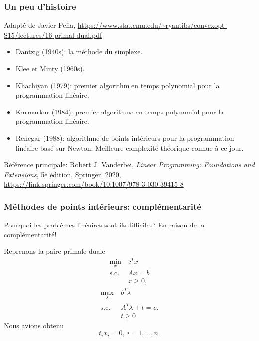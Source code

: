\documentclass[t,usepdftitle=false]{beamer}
\begin{document}
\begin{frame}
\frametitle{Un peu d'histoire}

Adapté de Javier Peña, \url{https://www.stat.cmu.edu/~ryantibs/convexopt-S15/lectures/16-primal-dual.pdf}
\begin{itemize}
\item 
Dantzig (1940s): la méthode du simplexe.
\item
Klee et Minty (1960s).
\item 
Khachiyan (1979): premier algorithm en temps polynomial pour la programmation linéaire.
\item
Karmarkar (1984): premier algorithme en temps polynomial pour la programmation linéaire.
\item 
Renegar (1988): algorithme de points intérieurs pour la programmation linéaire basé sur Newton. Meilleure complexité théorique connue à ce jour.
\end{itemize}

Référence principale: Robert J. Vanderbei, \textit{Linear
Programming: Foundations and Extensions}, 5e édition, Springer, 2020, \url{https://link.springer.com/book/10.1007/978-3-030-39415-8}

\end{frame}

\begin{frame}
\frametitle{Méthodes de points intérieurs: complémentarité}

Pourquoi les problèmes linéaires sont-ils difficiles? En raison de la complémentarité!

\mbox{}

Reprenons la paire primale-duale
\begin{align*}
\min_x\ & c^T x \\
\mbox{s.c. } & Ax = b \\
& x \geq 0,
\end{align*}
\begin{align*}
\max_{\lambda} \  & b^T \lambda \\
\mbox{s.c. } & A^T \lambda  +t = c. \\
& t \geq 0
\end{align*}
Nous avions obtenu
\[
t_i x_i = 0, \ i = 1,\ldots, n.
\]

\end{frame}
\end{document}

